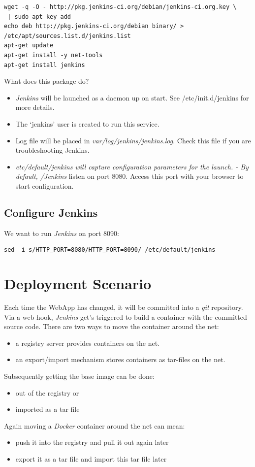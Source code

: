 \documentclass[captions=tableheading]{article}
\begin{document}
\begin{verbatim}
wget -q -O - http://pkg.jenkins-ci.org/debian/jenkins-ci.org.key \
 | sudo apt-key add - 
echo deb http://pkg.jenkins-ci.org/debian binary/ >  /etc/apt/sources.list.d/jenkins.list
apt-get update
apt-get install -y net-tools
apt-get install jenkins
\end{verbatim}

What does this package do?
\begin{itemize}
\item \emph{Jenkins} will be launched as a daemon up on start. See /etc/init.d/jenkins for more details.
\item The `jenkins' user is created to run this service.
\item Log file will be placed in \emph{var/log/jenkins/jenkins.log}. Check this file if you are troubleshooting Jenkins.
\item \emph{etc/default/jenkins will capture configuration parameters for the launch. - By default, /Jenkins} listen on port 8080. Access this port with your browser to start configuration.
\end{itemize}
\subsection{Configure Jenkins}
\label{sec-5-2}

We want to run \emph{Jenkins} on port 8090: 

\begin{verbatim}
sed -i s/HTTP_PORT=8080/HTTP_PORT=8090/ /etc/default/jenkins
\end{verbatim}
\section{Deployment Scenario}
\label{sec-6}

Each time the WebApp has changed, it will be committed into a \emph{git} repository. Via a web hook, \emph{Jenkins} get's triggered to build a container with the committed source code. There are two ways to move the container around the net:
\begin{itemize}
\item a registry server provides containers on the net.
\item an export/import mechanism stores containers as tar-files on the net.
\end{itemize}
Subsequently getting  the base image can be done: 
\begin{itemize}
\item out of the registry or
\item imported as a tar file
\end{itemize}
Again moving a \emph{Docker} container around the net can mean: 
\begin{itemize}
\item push it into the registry and pull it out again later
\item export it as a tar file and import this tar file later
\end{itemize}
\end{document}
